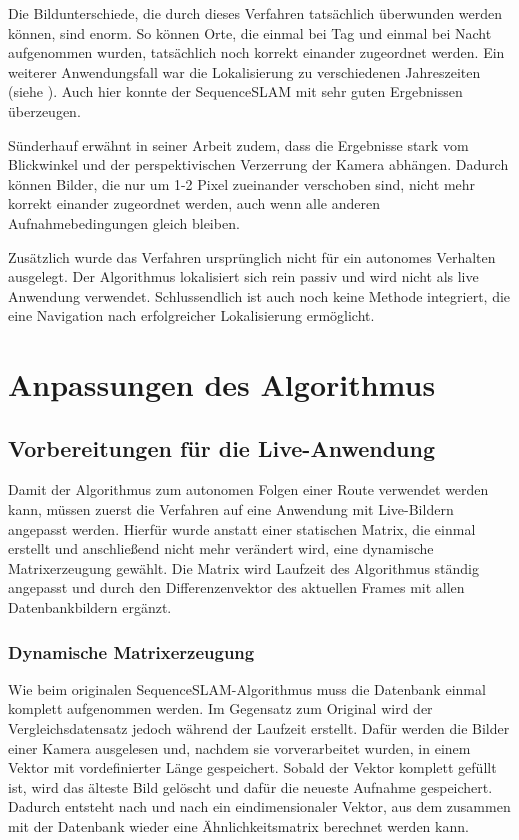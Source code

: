 \documentclass[12pt,a4paper,titlepage]{scrartcl}
\begin{document}
Die Bildunterschiede, die durch dieses Verfahren tatsächlich überwunden werden können, sind enorm. So können Orte, die einmal bei Tag und einmal bei Nacht aufgenommen wurden, tatsächlich noch korrekt einander zugeordnet werden. Ein weiterer Anwendungsfall war die Lokalisierung zu verschiedenen Jahreszeiten (siehe \cite{sunderhauf2013we}). Auch hier konnte der SequenceSLAM mit sehr guten Ergebnissen überzeugen.

Sünderhauf erwähnt in seiner Arbeit zudem, dass die Ergebnisse stark vom Blickwinkel und der perspektivischen Verzerrung der Kamera abhängen. Dadurch können Bilder, die nur um 1-2 Pixel zueinander verschoben sind, nicht mehr korrekt einander zugeordnet werden, auch wenn alle anderen Aufnahmebedingungen gleich bleiben. 

Zusätzlich wurde das Verfahren ursprünglich nicht für ein autonomes Verhalten ausgelegt. Der Algorithmus lokalisiert sich rein passiv und wird nicht als live Anwendung verwendet. Schlussendlich ist auch noch keine Methode integriert, die eine Navigation nach erfolgreicher Lokalisierung ermöglicht. 
\pagebreak
\section{Anpassungen des Algorithmus}
\subsection{Vorbereitungen für die Live-Anwendung} 
Damit der Algorithmus zum autonomen Folgen einer Route verwendet werden kann, müssen zuerst die Verfahren auf eine Anwendung mit Live-Bildern angepasst werden. Hierfür wurde anstatt einer statischen Matrix, die einmal erstellt und anschließend nicht mehr verändert wird, eine dynamische Matrixerzeugung gewählt. Die Matrix wird Laufzeit des Algorithmus ständig angepasst und durch den Differenzenvektor des aktuellen Frames mit allen Datenbankbildern ergänzt.
\subsubsection{Dynamische Matrixerzeugung}
Wie beim originalen SequenceSLAM-Algorithmus muss die Datenbank einmal komplett aufgenommen werden. Im Gegensatz zum Original wird der Vergleichsdatensatz jedoch während der Laufzeit erstellt. Dafür werden die Bilder einer Kamera ausgelesen und, nachdem sie vorverarbeitet wurden, in einem Vektor mit vordefinierter Länge gespeichert. Sobald der Vektor komplett gefüllt ist, wird das älteste Bild gelöscht und dafür die neueste Aufnahme gespeichert. Dadurch entsteht nach und nach ein eindimensionaler Vektor, aus dem zusammen mit der Datenbank wieder eine Ähnlichkeitsmatrix berechnet werden kann.
\end{document}
